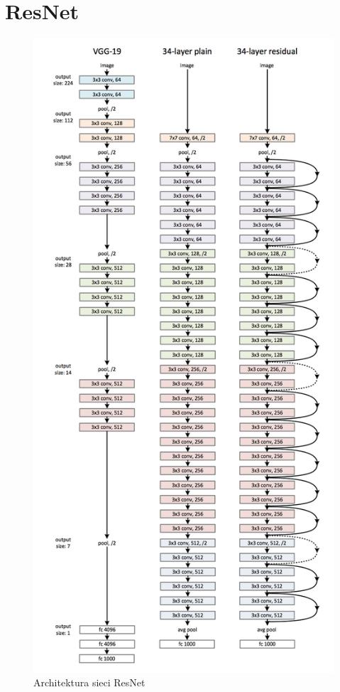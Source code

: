 \documentclass[12pt,a4paper,twoside,titlepage,openright]{book}
\begin{document}
\section{ResNet}
\begin{figure}[ht]
	\centering
			\includegraphics[resolution=100, scale=0.5]{ResNet.png}
		\caption{Architektura sieci ResNet}
\end{figure}
\end{document}
